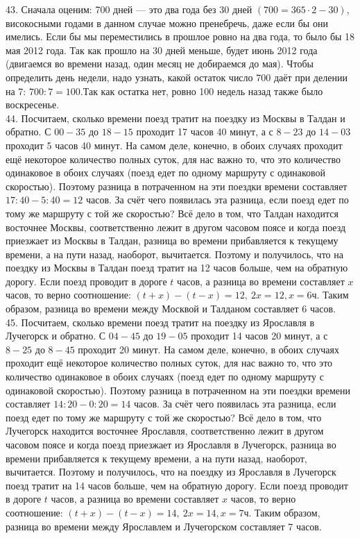 43. Сначала оценим: 700 дней --- это два года без 30 дней $(700=365\cdot2-30),$ високосными годами в данном случае можно пренебречь, даже если бы они имелись. Если бы мы переместились в прошлое ровно на два года, то было бы 18 мая 2012 года. Так как прошло на 30 дней меньше, будет июнь 2012 года (двигаемся во времени назад, один месяц не добираемся до мая). Чтобы определить день недели, надо узнать, какой остаток число 700 даёт при делении на 7: $700:7=100.$Так как остатка нет, ровно 100 недель назад также было воскресенье.\\
44. Посчитаем, сколько времени поезд тратит на поездку из Москвы в Талдан и обратно. С $00-35$ до $18-15$ проходит 17 часов 40 минут, а с $8-23$ до $14-03$ проходит 5 часов 40 минут. На самом деле, конечно, в обоих случаях проходит ещё некоторое количество полных суток, для нас важно то, что это количество одинаковое в обоих случаях (поезд едет по одному маршруту с одинаковой скоростью). Поэтому разница в потраченном на эти поездки времени составляет $17:40-5:40=12$ часов. За счёт чего появилась эта разница, если поезд едет по тому же маршруту с той же скоростью? Всё дело в том, что Талдан находится восточнее Москвы, соответственно лежит в другом часовом поясе и когда поезд приезжает из Москвы в Талдан, разница во времени прибавляется к текущему времени, а на пути назад, наоборот, вычитается. Поэтому и получилось, что на поездку из Москвы в Талдан поезд тратит на 12 часов больше, чем на обратную дорогу. Если поезд проводит в дороге $t$ часов, а разница во времени составляет $x$ часов, то верно соотношение: $(t+x)-(t-x)=12,\ 2x=12, x=6$ч. Таким образом, разница во времени между Москвой и Талданом составляет 6 часов.\\
45. Посчитаем, сколько времени поезд тратит на поездку из Ярославля в Лучегорск и обратно. С $04-45$ до $19-05$ проходит 14 часов 20 минут, а с $8-25$ до $8-45$ проходит 20 минут. На самом деле, конечно, в обоих случаях проходит ещё некоторое количество полных суток, для нас важно то, что это количество одинаковое в обоих случаях (поезд едет по одному маршруту с одинаковой скоростью). Поэтому разница в потраченном на эти поездки времени составляет $14:20-0:20=14$ часов. За счёт чего появилась эта разница, если поезд едет по тому же маршруту с той же скоростью? Всё дело в том, что Лучегорск находится восточнее Ярославля, соответственно лежит в другом часовом поясе и когда поезд приезжает из Ярославля в Лучегорск, разница во времени прибавляется к текущему времени, а на пути назад, наоборот, вычитается. Поэтому и получилось, что на поездку из Ярославля в Лучегорск поезд тратит на 14 часов больше, чем на обратную дорогу. Если поезд проводит в дороге $t$ часов, а разница во времени составляет $x$ часов, то верно соотношение: $(t+x)-(t-x)=14,\ 2x=14, x=7$ч. Таким образом, разница во времени между Ярославлем и Лучегорском составляет 7 часов.\\
